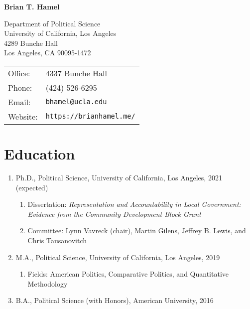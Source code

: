 \documentclass[12pt]{article}
\def\name{\textbf{Brian T. Hamel}}
\begin{document}
{\huge \name}


\vspace{0.25in}

\begin{minipage}{0.5\linewidth}
  Department of Political Science \\
  University of California, Los Angeles \\
  4289 Bunche Hall \\
  Los Angeles, CA 90095-1472 
\end{minipage}
\begin{minipage}{0.5\linewidth}
  \begin{tabular}{ll}
    Office: & 4337 Bunche Hall \\
    Phone: & (424) 526-6295 \\
    Email: & \texttt{bhamel@ucla.edu} \\
    Website: & \texttt{https://brianhamel.me/} \\
  \end{tabular}
\end{minipage}

\section*{Education}

\begin{enumerate}[topsep = 0pt, itemsep = 1ex, partopsep  = 1ex, parsep = 1ex]

	\item[] Ph.D., Political Science, University of California, Los Angeles, 2021 (expected)
	
	\begin{enumerate}[topsep = 0pt, itemsep = -1ex, partopsep = -1ex, parsep = 1ex]
	
		\item[] Dissertation: \textit{Representation and Accountability in Local Government: Evidence from the Community Development Block Grant}
		
		\item[] Committee: Lynn Vavreck (chair), Martin Gilens, Jeffrey B. Lewis, and Chris Tausanovitch
	
	\end{enumerate}
		
	\item[] M.A., Political Science, University of California, Los Angeles, 2019
	
	\begin{enumerate}[topsep = 0pt, itemsep = -1ex, partopsep  = -1ex, parsep = 1ex]
	
		\item[] Fields: American Politics, Comparative Politics, and Quantitative Methodology
	
	\end{enumerate}
		
	\item[] B.A., Political Science (with Honors), American University, 2016

\end{enumerate}
\end{document}
